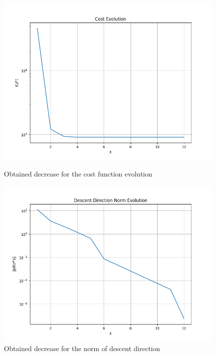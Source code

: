\documentclass[a4paper,11pt,oneside]{book}
\begin{document}
\begin{itemize}
\begin{figure}[ht]
    \begin{minipage}[t]{0.48\textwidth}
        \centering
        \includegraphics[width=\textwidth]{Cost_Evolution_T1.png}
        \caption{Obtained decrease for the cost function evolution}
        \label{fig:sinistra}
    \end{minipage}
    \hfill
    \begin{minipage}[t]{0.48\textwidth}
        \centering
        \includegraphics[width=\textwidth]{Descent_Direction_T1.png}
        \caption{Obtained decrease for the norm of descent direction}
        \label{fig:destra}
    \end{minipage}
\end{figure}
\end{itemize}
\newpage
\end{document}
